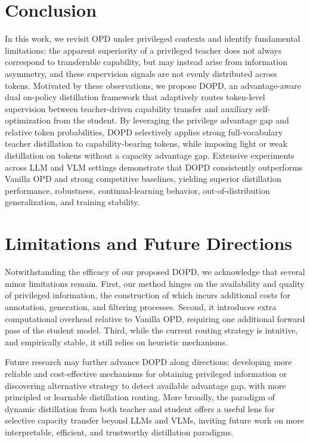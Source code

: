 \documentclass{llmxive}
\begin{document}
\section{Conclusion}
In this work, we revisit OPD under privileged contexts and identify fundamental limitations: the apparent superiority of a privileged teacher does not always correspond to transferable capability, but may instead arise from information asymmetry, and these supervision signals are not evenly distributed across tokens.
Motivated by these observations, we propose DOPD, an advantage-aware dual on-policy distillation framework that adaptively routes token-level supervision between teacher-driven capability transfer and auxiliary self-optimization from the student. 
By leveraging the privilege advantage gap and relative token probabilities, DOPD selectively applies strong full-vocabulary teacher distillation to capability-bearing tokens, while imposing light or weak distillation on tokens without a capacity advantage gap.
Extensive experiments across LLM and VLM settings demonstrate that DOPD consistently outperforms Vanilla OPD and strong competitive baselines, yielding superior distillation performance, robustness, continual-learning behavior, out-of-distribution generalization, and training stability. 



\section{Limitations and Future Directions}
Notwithstanding the efficacy of our proposed DOPD, we acknowledge that several minor limitations remain.
First, our method hinges on the availability and quality of privileged information, the construction of which incurs additional costs for annotation, generation, and filtering processes.
Second, it introduces extra computational overhead relative to Vanilla OPD, requiring one additional forward pass of the student model.
Third, while the current routing strategy is intuitive, and empirically stable, it still relies on heuristic mechanisms.




Future research may further advance DOPD along directions: developing more reliable and cost-effective mechanisms for obtaining privileged information or discovering alternative strategy to detect available  advantage gap, with more principled or learnable distillation routing. More broadly, the paradigm of dynamic distillation from both teacher and student offers a useful lens for selective capacity transfer beyond LLMs and VLMs, inviting future work on more interpretable, efficient, and trustworthy distillation paradigms.
\end{document}
